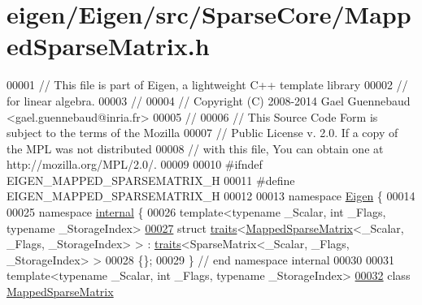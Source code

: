 \hypertarget{eigen_2_eigen_2src_2_sparse_core_2_mapped_sparse_matrix_8h_source}{}\section{eigen/\+Eigen/src/\+Sparse\+Core/\+Mapped\+Sparse\+Matrix.h}
\label{eigen_2_eigen_2src_2_sparse_core_2_mapped_sparse_matrix_8h_source}

\begin{DoxyCode}
00001 \textcolor{comment}{// This file is part of Eigen, a lightweight C++ template library}
00002 \textcolor{comment}{// for linear algebra.}
00003 \textcolor{comment}{//}
00004 \textcolor{comment}{// Copyright (C) 2008-2014 Gael Guennebaud <gael.guennebaud@inria.fr>}
00005 \textcolor{comment}{//}
00006 \textcolor{comment}{// This Source Code Form is subject to the terms of the Mozilla}
00007 \textcolor{comment}{// Public License v. 2.0. If a copy of the MPL was not distributed}
00008 \textcolor{comment}{// with this file, You can obtain one at http://mozilla.org/MPL/2.0/.}
00009 
00010 \textcolor{preprocessor}{#ifndef EIGEN\_MAPPED\_SPARSEMATRIX\_H}
00011 \textcolor{preprocessor}{#define EIGEN\_MAPPED\_SPARSEMATRIX\_H}
00012 
00013 \textcolor{keyword}{namespace }\hyperlink{namespace_eigen}{Eigen} \{
00014 
00025 \textcolor{keyword}{namespace }\hyperlink{namespaceinternal}{internal} \{
00026 \textcolor{keyword}{template}<\textcolor{keyword}{typename} \_Scalar, \textcolor{keywordtype}{int} \_Flags, \textcolor{keyword}{typename} \_StorageIndex>
\hyperlink{struct_eigen_1_1internal_1_1traits_3_01_mapped_sparse_matrix_3_01___scalar_00_01___flags_00_01___storage_index_01_4_01_4}{00027} \textcolor{keyword}{struct }\hyperlink{struct_eigen_1_1internal_1_1traits}{traits}<\hyperlink{class_eigen_1_1_mapped_sparse_matrix}{MappedSparseMatrix}<\_Scalar, \_Flags, \_StorageIndex> > : 
      \hyperlink{struct_eigen_1_1internal_1_1traits}{traits}<SparseMatrix<\_Scalar, \_Flags, \_StorageIndex> >
00028 \{\};
00029 \} \textcolor{comment}{// end namespace internal}
00030 
00031 \textcolor{keyword}{template}<\textcolor{keyword}{typename} \_Scalar, \textcolor{keywordtype}{int} \_Flags, \textcolor{keyword}{typename} \_StorageIndex>
\hyperlink{class_eigen_1_1_mapped_sparse_matrix}{00032} \textcolor{keyword}{class }\hyperlink{class_eigen_1_1_mapped_sparse_matrix}{MappedSparseMatrix}

\end{DoxyCode}
